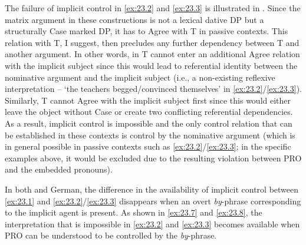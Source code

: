 \documentclass[output=paper]{langsci/langscibook}
\begin{document}
The failure of implicit control in \eqref{ex:23.2} and \eqref{ex:23.3}
is illustrated in . Since the matrix argument in these
constructions is not a lexical dative DP but a structurally Case marked DP, it
has to Agree with T in passive contexts. This relation with T, I suggest, then
precludes any further dependency between T and another argument. In other
words, in  T cannot enter an additional Agree relation with
the implicit subject since this would lead to referential identity between the
nominative argument and the implicit subject (i.e., a
non-existing reflexive interpretation – ‘the teachers begged/convinced
themselves’ in \eqref{ex:23.2}/\eqref{ex:23.3}). Similarly, T cannot
Agree with the implicit subject first since this would either leave the object
without Case or create two conflicting referential dependencies. As a result,
implicit control is impossible and the only
control relation that can be established in these contexts is control by the
nominative argument (which is in general possible in
passive contexts such as \eqref{ex:23.2}/\eqref{ex:23.3};
in the specific examples above, it would be excluded due to the resulting
 violation between PRO and the embedded pronouns).\largerpage

In both  and German, the difference in the availability of implicit
control between \eqref{ex:23.1} and \eqref{ex:23.2}/\eqref{ex:23.3}
disappears when an overt \emph{by}-phrase corresponding to the implicit agent
is present. As shown in \eqref{ex:23.7} and \eqref{ex:23.8}, the
interpretation that is impossible in \eqref{ex:23.2} and
\eqref{ex:23.3} becomes available when PRO can be understood to be
controlled by the \emph{by}-phrase.\largerpage
\end{document}
